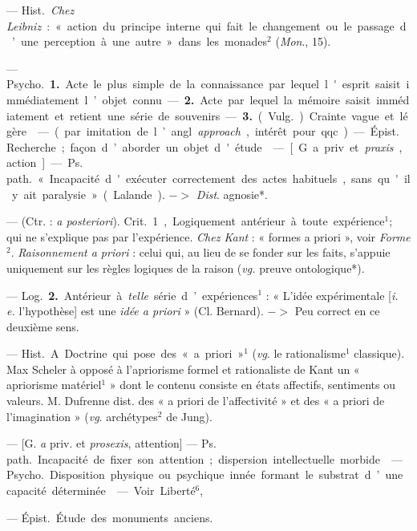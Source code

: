 \begin{itemize}[leftmargin=1cm, label=, itemsep=1pt]
{{{{ — \si{Hist.} {\it Chez Leibniz} :
« action du principe interne qui fait
le changement ou le passage d’une
perception à une autre » dans les
monades$^2$ ({\it Mon}., 15).

 — \si{Psycho.} {\bf 1.} Acte le
plus simple de la connaissance par
lequel l'esprit saisit immédiatement
l’objet connu. — {\bf 2.} Acte par lequel
la mémoire saisit immédiatement et
retient une série de souvenirs. —
 {\bf 3.} (\si{Vulg.}) Crainte vague et légère.

 — (par imitation de l’angl.
{\it approach}, intérêt pour qqc). —
\si{Épist.} Recherche; façon d’aborder
un objet d'étude.

 — [G. a priv. et {\it praxis}, action]
— \si{Ps. path.} « Incapacité d'exécuter
correctement des actes habituels,
sans qu'il y ait paralysie » (Lalande).
$->$ {\it Dist}. agnosie*.

 — (Ctr. : {\it a posteriori}). \si{Crit.}
1, Logiquement antérieur à toute
expérience$^1$; qui ne s'explique pas
par l'expérience. {\it Chez Kant} : « formes
a priori », voir {\it Forme}$^2$. {\it Raisonnement a priori} : celui qui, au lieu de
se fonder sur les faits, s’appuie uniquement sur les règles logiques de la
raison ({\it vg.} preuve ontologique*).

— \si{Log.} {\bf 2.} Antérieur à {\it telle} série
d’expériences$^1$ : « L'idée expérimentale [{\it i. e.} l'hypothèse] est une {\it idée
a priori} » (Cl. Bernard). $->$ Peu
correct en ce deuxième sens.

 — \si{Hist.} A. Doctrine qui
pose des « a priori »$^1$ ({\it vg}. le rationalisme$^1$ classique). Max Scheler à
opposé à l’apriorisme formel et rationaliste de Kant un « apriorisme
matériel$^1$ » dont le contenu consiste
en états affectifs, sentiments ou
valeurs. M. Dufrenne dist. des « a
priori de l’affectivité » et des « a
priori de l'imagination » ({\it vg}. archétypes$^2$ de Jung).

 — [G. {\it a} priv. et {\it prosexis}, attention] — \si{Ps. path.} Incapacité de
fixer son attention; dispersion intellectuelle morbide.

 — \si{Psycho.} Disposition physique ou psychique innée formant le
substrat d’une capacité déterminée.

 — Voir Liberté$^6$,

 — \si{Épist.} Étude des monuments anciens.

}}}}
\end{itemize}

